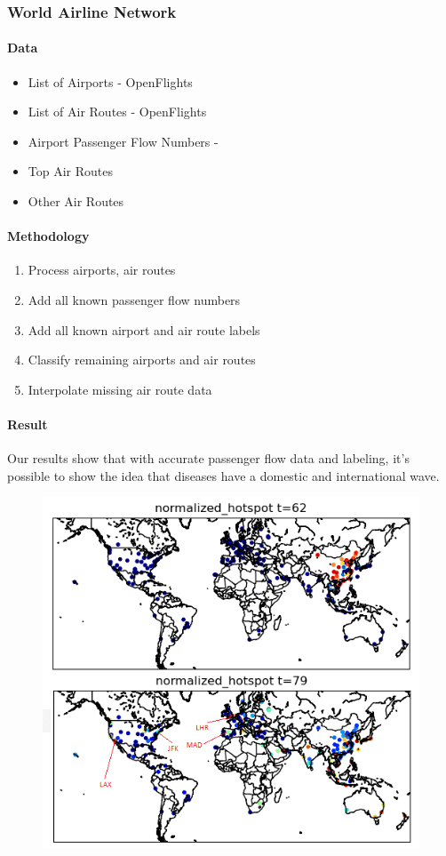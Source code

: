 \documentclass[12pt, a4, epsf] {article}
\theoremstyle{plain}
\theoremstyle{definition}
\begin{document}
\subsubsection{World Airline Network}
\paragraph{Data}
\begin{itemize}
    \item List of Airports - OpenFlights \cite{openflights}
    \item List of Air Routes - OpenFlights \cite{openflights}
    \item Airport Passenger Flow Numbers - \cite{airport_traffic}
    \item Top Air Routes \cite{airport_pairs}
    \item Other Air Routes
\end{itemize}
\paragraph{Methodology}
\begin{enumerate}
    \item Process airports, air routes
    \item Add all known passenger flow numbers
	\item Add all known airport and air route labels
	\item Classify remaining airports and air routes
	\item Interpolate missing air route data 
\end{enumerate}
\paragraph{Result}
Our results show that with accurate passenger flow data and labeling, it's possible to show the idea that diseases have a domestic and international wave.
\FloatBarrier
\begin{figure}[htbp]
    \includegraphics[width=1.0\textwidth]{Scratch_Visuals/covid_airlines.png}
\end{figure}
\end{document}
